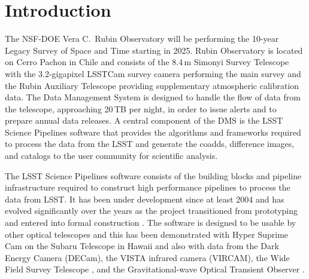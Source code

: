\section{Introduction}
\label{sec:intro}

The NSF-DOE Vera C.\ Rubin Observatory will be performing the 10-year Legacy Survey of Space and Time \citep[LSST;][]{2019ApJ...873..111I} starting in 2025.
Rubin Observatory is located on Cerro Pachon in Chile and consists of the 8.4\,m Simonyi Survey Telescope \citep{2022SPIE12182E..0WT} with the 3.2-gigapixel LSSTCam survey camera \citep{2024SPIE13096E..1SR} performing the main survey and the Rubin Auxiliary Telescope \citep{2020SPIE11452E..0UI} providing supplementary atmospheric calibration data.
The Data Management System \citep[DMS;][]{2022arXiv221113611O} is designed to handle the flow of data from the telescope, approaching 20\,TB per night, in order to issue alerts and to prepare annual data releases.
A central component of the DMS is the LSST Science Pipelines software that provides the algorithms and frameworks required to process the data from the LSST and generate the coadds, difference images, and catalogs to the user community for scientific analysis.

The LSST Science Pipelines software consists of the building blocks and pipeline infrastructure required to construct high performance pipelines to process the data from LSST.
It has been under development since at least 2004 \citep{2004AAS...20510811A} and has evolved significantly over the years as the project transitioned from prototyping \citep{2010SPIE.7740E..15A} and entered into formal construction \citep{2017ASPC..512..279J}.
The software is designed to be usable by other optical telescopes and this has been demonstrated with Hyper Suprime Cam on the Subaru Telescope in Hawaii \citep{2018PASJ...70S...5B} and also with data from the Dark Energy Camera (DECam),  the VISTA infrared camera (VIRCAM), the Wide Field Survey Telescope \citep[WFST;][]{2025arXiv250115018C}, and the Gravitational-wave Optical Transient Observer \citep[GOTO;][]{2021PASA...38....4M}.

